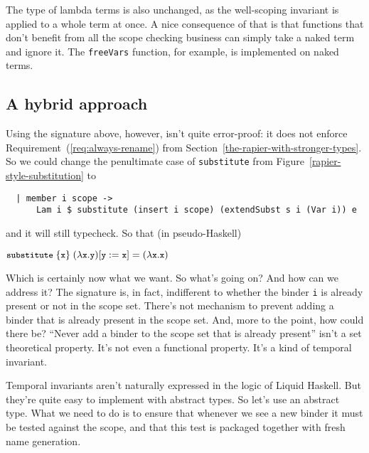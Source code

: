 \documentclass[sigconf, anonymous, review]{acmart}
\newcommand{\tc}[1]{{\small\texttt{#1}}}
\newcommand{\codeblocksize}{\fontsize{6.5}{9}\selectfont}
\begin{document}
The type of lambda terms is also unchanged, as the well-scoping invariant is
applied to a whole term at once. A nice consequence of that is that functions
that don't benefit from all the scope checking business can simply take a naked
term and ignore it. The \tc{freeVars} function, for example, is implemented on
naked terms.

\subsection{A hybrid approach}
\label{ensuring-the-scope-set-is-checked}

Using the signature above, however, isn't quite error-proof: it does not enforce
Requirement~(\ref{req:always-rename}) from
Section~\ref{the-rapier-with-stronger-types}.
So we could change the penultimate case of \tc{substitute} from
Figure~\ref{rapier-style-substitution} to
\begin{verbatim}
  | member i scope ->
      Lam i $ substitute (insert i scope) (extendSubst s i (Var i)) e
\end{verbatim}
and it will still typecheck. So that
(in pseudo-Haskell)

$\codeblocksize{\tc{substitute}~\{\tc{x}\}~(\lambda{}\tc{x}. \tc{y}) [\tc{y}:=\tc{x}] = (\lambda{}\tc{x}. \tc{x})}$

Which is certainly now what we want. So what's going on? And how can we address
it? The signature is, in fact, indifferent to whether the binder \tc{i}
is already present or not in the scope set. There's not mechanism to prevent
adding a binder that is already present in the scope set. And, more to the
point, how could there be? “Never add a binder to the scope set that is already
present” isn't a set theoretical property. It's not even a functional property.
It's a kind of temporal invariant.

Temporal invariants aren't naturally expressed in the logic of Liquid Haskell.
But they're quite easy to implement with abstract types. So let's use an abstract
type. What we need to do is to ensure that whenever we see a new binder it must
be tested against the scope, and that this test is packaged together with fresh
name generation.
\end{document}
